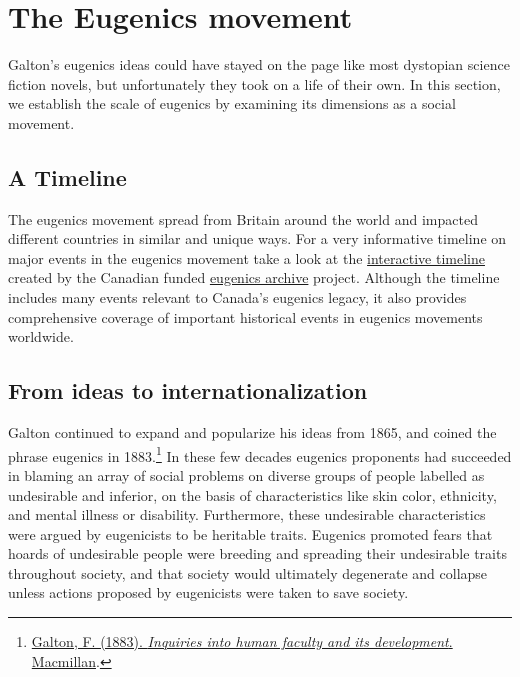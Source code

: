 \documentclass[
  oneside,
  12pt]{crumpbook}
\begin{document}
\hypertarget{the-eugenics-movement}{%
\section{The Eugenics movement}\label{the-eugenics-movement}}

Galton's eugenics ideas could have stayed on the page like most dystopian science fiction novels, but unfortunately they took on a life of their own. In this section, we establish the scale of eugenics by examining its dimensions as a social movement.

\hypertarget{a-timeline}{%
\subsection{A Timeline}\label{a-timeline}}

The eugenics movement spread from Britain around the world and impacted different countries in similar and unique ways. For a very informative timeline on major events in the eugenics movement take a look at the \href{https://eugenicsarchive.ca/discover/timeline}{interactive timeline} created by the Canadian funded \href{https://eugenicsarchive.ca/}{eugenics archive} project. Although the timeline includes many events relevant to Canada's eugenics legacy, it also provides comprehensive coverage of important historical events in eugenics movements worldwide.

\hypertarget{from-ideas-to-internationalization}{%
\subsection{From ideas to internationalization}\label{from-ideas-to-internationalization}}

Galton continued to expand and popularize his ideas from 1865, and coined the phrase eugenics in 1883.\footnote{\protect\hyperlink{ref-galtonInquiriesHumanFaculty1883}{Galton, F. (1883). \emph{Inquiries into human faculty and its development}. {Macmillan}}.} In these few decades eugenics proponents had succeeded in blaming an array of social problems on diverse groups of people labelled as undesirable and inferior, on the basis of characteristics like skin color, ethnicity, and mental illness or disability. Furthermore, these undesirable characteristics were argued by eugenicists to be heritable traits. Eugenics promoted fears that hoards of undesirable people were breeding and spreading their undesirable traits throughout society, and that society would ultimately degenerate and collapse unless actions proposed by eugenicists were taken to save society.
\end{document}
